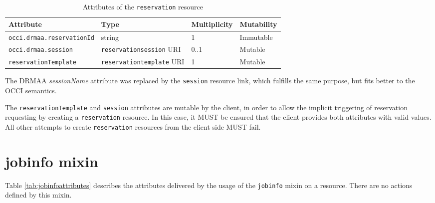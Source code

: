 \documentclass[10pt]{article}
\newcommand{\h}[1]{\lstinline|#1|}
\begin{document}
\begin{table}[ht]
\centering
\begin{tabularx}{\textwidth}{|l|X|X|X|}
\hline 
Attribute                    & Type                        & Multiplicity & Mutability \\
\hline
\h{occi.drmaa.reservationId} & string                      & 1     & Immutable \\ %
\h{occi.drmaa.session}       & \h{reservationsession} URI  & 0..1  & Mutable   \\ %
\h{reservationTemplate}      & \h{reservationtemplate} URI & 1     & Mutable   \\ %
\hline
\end{tabularx}
\caption{Attributes of the \h{reservation} resource}
\label{tab:reservationattributes}
\end{table}

The DRMAA \emph{sessionName} attribute was replaced by the \h{session} resource link, which fulfills the same purpose, but fits better to the OCCI semantics.

The \h{reservationTemplate} and \h{session} attributes are mutable by the client, in order to allow the implicit triggering of reservation requesting by creating a \h{reservation} resource. In this case, it MUST be ensured that the client provides both attributes with valid values. All other attempts to create \h{reservation} resources from the client side MUST fail.


\section{jobinfo mixin}

Table \ref{tab:jobinfoattributes} describes the attributes delivered by the usage of the \h{jobinfo} mixin on a resource. There are no actions defined by this mixin.
\end{document}
